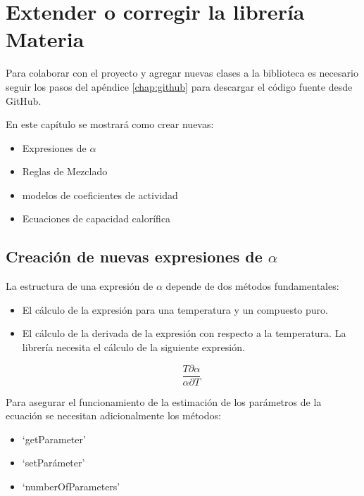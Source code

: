 \chapter{Extender o corregir la librería Materia}\label{chap:libraryExtension}

	Para colaborar con el proyecto \Materia y agregar nuevas clases a la biblioteca es necesario seguir los pasos del apéndice \ref{chap:github} para descargar el código fuente desde GitHub.	
	
 	En este capítulo se mostrará como crear nuevas:

 	\begin{itemize}\itemsep0ex
 		\item{Expresiones de $\alpha$}
 		\item{Reglas de Mezclado}
 		\item{modelos de coeficientes de actividad} 		
 		\item{Ecuaciones de capacidad calorífica} 		
 	\end{itemize}

 
 	\section{Creación de nuevas expresiones de $\alpha$}\label{sec:newAlphaExpressions}

 	La estructura de una expresión de $\alpha$ depende de dos métodos fundamentales: 

 		\begin{itemize}\itemsep0ex
 			\item El cálculo de la expresión para una temperatura y un compuesto puro.
 			\item El cálculo de la derivada de la expresión con respecto a la temperatura. La librería necesita el cálculo de la siguiente expresión.

 			\begin{equation}
 				\frac{T \partial \alpha}{\alpha \partial T}
 			\end{equation}
 		\end{itemize}

 	Para asegurar el funcionamiento de la estimación de los parámetros de la ecuación se necesitan adicionalmente los métodos:
 		\begin{itemize}\itemsep0ex
 			\item `getParameter'
 			\item `setParámeter'
 			\item `numberOfParameters'
 		\end{itemize}


